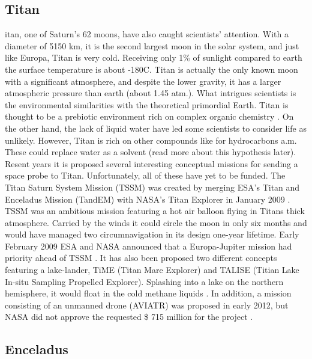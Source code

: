 \begin{multicols}{2}
\subsection{Titan}


 
itan, one of Saturn's 62 moons, have also caught scientists' attention.
With a diameter of 5150 km, it is the second largest moon in the solar system, and just like Europa, Titan is very cold.
Receiving only 1\% of sunlight compared to earth the surface temperature is about -180\degree C.
Titan is actually the only known moon with a significant atmosphere, and despite the lower gravity, it has a larger atmospheric pressure than earth (about 1.45 atm.).
What intrigues scientists is the environmental similarities with the theoretical primordial Earth.
Titan is thought to be a prebiotic environment rich on complex organic chemistry \cite{RichOrganics}. On the other hand, the lack of liquid water have led some scientists to consider life as unlikely.
However, Titan is rich on other compounds like for hydrocarbons a.m.
These could replace water as a solvent (read more about this hypothesis later).
Resent years it is proposed several interesting conceptual missions for sending a space probe to Titan. Unfortunately, all of these have yet to be funded.
The Titan Saturn System Mission (TSSM) was created by merging ESA’s Titan and Enceladus Mission (TandEM) with NASA’s Titan Explorer in January 2009 \cite{FPlan10}.
TSSM was an ambitious mission featuring a hot air balloon flying in Titans thick atmosphere.
Carried by the winds it could circle the moon in only six months and would have managed two circumnavigation in its design one-year lifetime.
Early February 2009 ESA and NASA announced that a Europa-Jupiter mission had priority ahead of TSSM \cite{FPlan07}.
It has also been proposed two different concepts featuring a lake-lander, TiME (Titan Mare Explorer) and TALISE (Titian Lake In-situ Sampling Propelled Explorer).
Splashing into a lake on the northern hemisphere, it would float in the cold methane liquids \cite{TiME} \cite{TALISE}.
In addition, a mission consisting of an unmanned drone (AVIATR) was proposed in early 2012, but NASA did not approve the requested \$ 715 million for the project \cite{AVIATR}.

\subsection{Enceladus}


\end{multicols}
